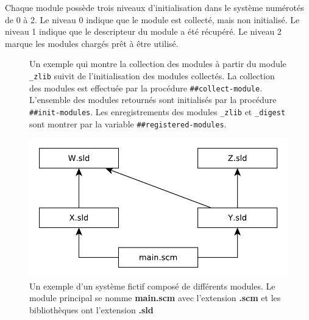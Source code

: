 Chaque module possède trois niveaux d'initialisation dans le système numérotés de
0 à 2. Le niveau 0 indique que le module est collecté, mais non initialisé. Le
niveau 1 indique que le descripteur du module a été récupéré. Le niveau 2 marque
les modules chargés prêt à être utilisé. \\

\begin{figure}[h]
  \caption{Un exemple qui montre la collection des modules à partir du module
    \texttt{\_zlib} suivit de l'initialisation des modules collectés. La collection
    des modules est effectuée par la procédure \texttt{\#\#collect-module}. L'ensemble
    des modules retournés sont initialisés par la procédure \texttt{\#\#init-modules}.
    Les enregistrements des modules \texttt{\_zlib} et \texttt{\_digest} sont montrer
    par la variable \texttt{\#\#registered-modules}.}
\end{figure}

\begin{figure}[ht]
  \includegraphics{figures/system-example}
  \caption{Un exemple d'un système fictif composé de différents modules.
  Le module principal se nomme \textbf{main.scm} avec l'extension \textbf{.scm}
  et les bibliothèques ont l'extension \textbf{.sld}}
  \label{fig:system-dependency-example}
\end{figure} %


